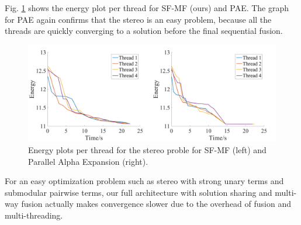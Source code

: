 %
%
%
Fig. \ref{fig:stereo_threads} shows the energy plot per thread
for SF-MF (ours) and PAE. The graph for PAE again confirms that the
stereo is an easy problem, because all the threads are quickly
converging to a solution before the final sequential fusion.
\begin{figure}[tb]
  \includegraphics[width=\columnwidth]{figure/stereo_threads.png}
  \caption{Energy plots per thread for the stereo proble for SF-MF (left) and
 Parallel Alpha Expansion (right).
} \label{fig:stereo_threads}
\end{figure}

For an easy optimization problem such as stereo with strong unary terms
and submodular pairwise terms, our full architecture with solution
sharing and multi-way fusion actually makes convergence slower due to the
overhead of fusion and multi-threading.









